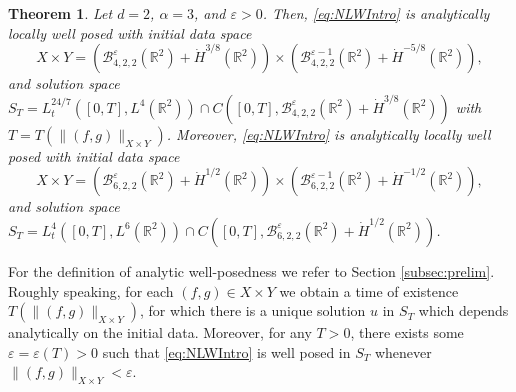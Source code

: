 \documentclass{amsart}
\newtheorem{theorem}{Theorem}[section]
\theoremstyle{definition}
\newcommand{\R}{\mathbb{R}}
\newcommand {\veps}{\varepsilon}
\numberwithin{equation}{section}
\begin{document}
\begin{theorem}%
\label{thm:LWPNLW}
Let $d=2$, $\alpha = 3$, and $\varepsilon > 0$. Then, \eqref{eq:NLWIntro} is analytically locally well posed with initial data space 
\begin{equation}\label{eq:LWPNLW1}
X \times Y = (\mathcal{B}^{\varepsilon}_{4,2,2}(\R^2) + \dot{H}^{3/8}(\R^2)) \times (\mathcal{B}^{\varepsilon-1}_{4,2,2}(\R^2) + \dot{H}^{-5/8}(\R^2)),
\end{equation}
and solution space $S_{T}= L_t^{24/7}([0,T],L^4(\R^2)) \cap C([0,T],\mathcal{B}^{\varepsilon}_{4,2,2}(\R^2) + \dot{H}^{3/8}(\R^2) )$ with $T = T(\|(f,g) \|_{X \times Y})$. Moreover, \eqref{eq:NLWIntro} is analytically locally well posed with initial data space
\begin{equation}\label{eq:LWPNLW2}
X \times Y = (\mathcal{B}^{\varepsilon}_{6,2,2}(\R^2) + \dot{H}^{1/2}(\R^2)) \times (\mathcal{B}^{\varepsilon-1}_{6,2,2}(\R^2) + \dot{H}^{-1/2}(\R^2)),
\end{equation}
and solution space $S_{T} = L_t^4([0,T],L^6(\R^2)) \cap C([0,T],\mathcal{B}^{\varepsilon}_{6,2,2}(\R^2) + \dot{H}^{1/2}(\R^2) )$.
%
\end{theorem}

For the definition of analytic well-posedness we refer to Section \ref{subsec:prelim}. Roughly speaking, for each $(f,g)\in X\times Y$ we obtain a time of existence  $T(\|(f,g)\|_{X\times Y})$, for which there is a unique solution $u$ in $S_{T}$ which depends analytically on the initial data. Moreover, for any $T>0$, there exists some $\veps=\veps(T)>0$ such that \eqref{eq:NLWIntro} is well posed in $S_{T}$ whenever $\|(f,g)\|_{X\times Y}<\veps$.
\end{document}
